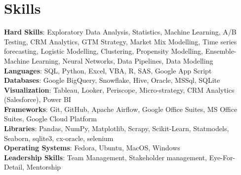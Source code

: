 \section{Skills}
  \begin{itemize}[leftmargin=0.1in, label={}]
    \normalsize{\item{
      \textbf{Hard Skills}: Exploratory Data Analysis, Statistics, Machine Learning, A/B Testing, CRM Analytics, GTM Strategy, Market Mix Modelling, Time series forecasting, Logistic Modelling, Clustering, Propensity Modelling, Ensemble-Machine Learning, Neural Networks, Data Pipelines, Data Modelling \\
      \textbf{Languages}: SQL, Python, Excel, VBA, R, SAS, Google App Script\\
      \textbf{Databases}: Google BigQuery, Snowflake, Hive, Oracle, MSSql, SQLite \\
      \textbf{Visualization}: Tableau, Looker, Periscope, Micro-strategy, CRM Analytics (Salesforce), Power BI \\
      \textbf{Frameworks}: Git, GitHub, Apache Airflow, Google Office Suites, MS Office Suites, Google Cloud Platform \\
      \textbf{Libraries}: Pandas, NumPy, Matplotlib, Scrapy, Scikit-Learn, Statmodels, Seaborn, sqlite3, cx-oracle, selenium \\
      \textbf{Operating Systems}: Fedora, Ubuntu, MacOS, Windows \\
      \textbf{Leadership Skills}: Team Management, Stakeholder management, Eye-For-Detail, Mentorship \\
     }}
  \end{itemize}
\vspace{-10pt}
